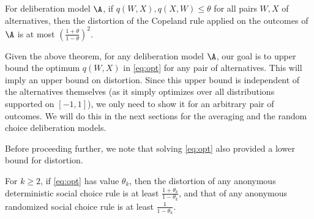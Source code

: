 \begin{theorem} 
\label{thm:distort1}
For deliberation model $\A$, if $q(W,X), q(X,W) \le \theta$ for all pairs $W,X$ of alternatives, then the distortion of the Copeland rule applied on the outcomes of $\A$ is at most $ \left( \frac{1 + \theta}{1-\theta}\right)^2$.
\end{theorem}


Given the above theorem, for any deliberation model $\A$,  our goal is to upper bound the optimum $q(W,X)$ in \cref{eq:opt} for any pair of alternatives. This will imply an upper bound on distortion. Since this upper bound is independent of the alternatives themselves (as it simply optimizes over all distributions supported on $[-1,1]$), we only need to show it for an arbitrary pair of outcomes. We will do this in the next sections for the averaging and the random choice deliberation models.

Before proceeding further, we note that solving \cref{eq:opt} also provided a lower bound for distortion.

\begin{theorem} 
\label{thm:lb_main}
For $k \ge 2$, if \cref{eq:opt} has value $\theta_k$, then the distortion of any anonymous deterministic social choice rule is at least $\frac{1+\theta_k}{1-\theta_k}$, and that of any anonymous randomized social choice rule is at least $\frac{1}{1-\theta_k}$.
\end{theorem}

